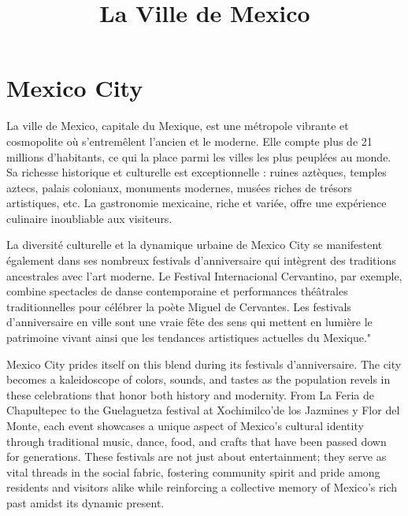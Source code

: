 \documentclass[12pt, a4paper]{article}
\title{La Ville de Mexico}
\author{}
\date{}
\begin{document}
   \maketitle

\section*{Mexico City}

   La ville de Mexico, capitale du Mexique, est une métropole vibrante et cosmopolite où s'entremêlent l'ancien et le moderne. Elle compte plus de 21 millions d'habitants, ce qui la place parmi les villes les plus peuplées au monde. Sa richesse historique et culturelle est exceptionnelle : ruines aztèques, temples aztecs, palais coloniaux, monuments modernes, musées riches de trésors artistiques, etc. La gastronomie mexicaine, riche et variée, offre une expérience culinaire inoubliable aux visiteurs.

	La diversité culturelle et la dynamique urbaine de Mexico City se manifestent également dans ses nombreux festivals d'anniversaire qui intègrent des traditions ancestrales avec l'art moderne. Le Festival Internacional Cervantino, par exemple, combine spectacles de danse contemporaine et performances théâtrales traditionnelles pour célébrer la poète Miguel de Cervantes. Les festivals d'anniversaire en ville sont une vraie fête des sens qui mettent en lumière le patrimoine vivant ainsi que les tendances artistiques actuelles du Mexique."

Mexico City prides itself on this blend during its festivals d’anniversaire. The city becomes a kaleidoscope of colors, sounds, and tastes as the population revels in these celebrations that honor both history and modernity. From La Feria de Chapultepec to the Guelaguetza festival at Xochimilco'de los Jazmines y Flor del Monte, each event showcases a unique aspect of Mexico’s cultural identity through traditional music, dance, food, and crafts that have been passed down for generations. These festivals are not just about entertainment; they serve as vital threads in the social fabric, fostering community spirit and pride among residents and visitors alike while reinforcing a collective memory of Mexico’s rich past amidst its dynamic present.


  
\end{document}
